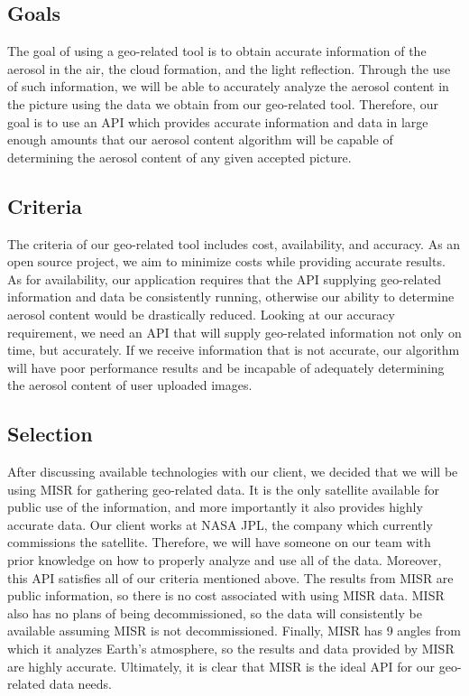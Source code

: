 \documentclass[onecolumn, draftclsnofoot,10pt, compsoc]{IEEEtran}
\begin{document}
\begin{flushleft}
\subsection{Goals}
The goal of using a geo-related tool is to obtain accurate information of the aerosol in the air, the cloud formation, and the light reflection. Through the use of such information, we will be able to accurately analyze the aerosol content in the picture using the data we obtain from our geo-related tool. Therefore, our goal is to use an API which provides accurate information and data in large enough amounts that our aerosol content algorithm will be capable of determining the aerosol content of any given accepted picture. 
\subsection{Criteria}
The criteria of our geo-related tool includes cost, availability, and accuracy. As an open source project, we aim to minimize costs while providing accurate results. As for availability, our application requires that the API supplying geo-related information and data be consistently running, otherwise our ability to determine aerosol content would be drastically reduced. Looking at our accuracy requirement, we need an API that will supply geo-related information not only on time, but accurately. If we receive information that is not accurate, our algorithm will have poor performance results and be incapable of adequately determining the aerosol content of user uploaded images.
\subsection{Selection}
After discussing available technologies with our client, we decided that we will be using MISR for gathering geo-related data. It is the only satellite available for public use of the information, and more importantly it also provides highly accurate data. Our client works at NASA JPL,  the company which currently commissions the satellite. Therefore, we will have someone on our team with prior knowledge on how to properly analyze and use all of the data. Moreover, this API satisfies all of our criteria mentioned above. The results from MISR are public information, so there is no cost associated with using MISR data. MISR also has no plans of being decommissioned, so the data will consistently be available assuming MISR is not decommissioned. Finally, MISR has 9 angles from which it analyzes Earth's atmosphere, so the results and data provided by MISR are highly accurate. Ultimately, it is clear that MISR is the ideal API for our geo-related data needs.


\end{flushleft}
\end{document}
